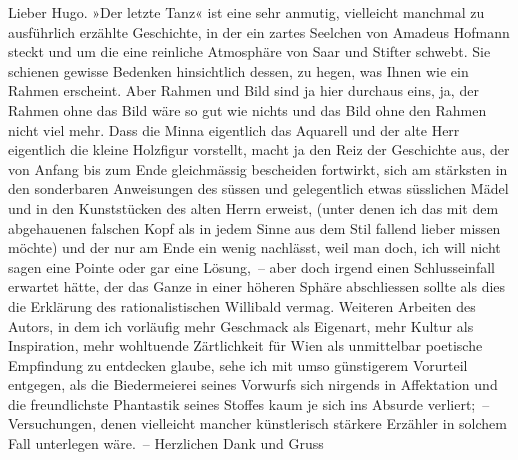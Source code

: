 \pstart\center{}Lieber Hugo.\pend\vspace{0.5em}
\pstart
           »Der letzte Tanz« ist eine sehr anmutig,
               vielleicht manchmal zu ausführlich erzählte Geschichte, in der ein zartes Seelchen
               von Amadeus Hofmann steckt und um die eine
               reinliche Atmosphäre von Saar und Stifter schwebt. Sie schienen gewisse Bedenken
               hinsichtlich dessen, zu hegen, was Ihnen wie ein Rahmen erscheint. Aber Rahmen und
               Bild sind ja hier durchaus eins, ja, der Rahmen ohne das Bild wäre so gut wie nichts
               und das Bild ohne den Rahmen nicht viel mehr. Dass die Minna eigentlich das Aquarell und der alte
               Herr eigentlich die kleine Holzfigur vorstellt, macht ja den Reiz der Geschichte aus,
               der von Anfang bis zum Ende gleichmässig bescheiden fortwirkt, sich am stärksten in
               den sonderbaren Anweisungen des süssen und gelegentlich etwas süsslichen Mädel und in
               den Kunststücken des alten {\pb}Herrn erweist, (unter denen ich
               das mit dem abgehauenen falschen Kopf als in jedem Sinne aus dem Stil fallend lieber
               missen möchte) und der nur am Ende ein wenig nachlässt, weil man doch, ich will nicht
               sagen eine Pointe oder gar eine Lösung, – aber doch irgend einen Schlusseinfall
               erwartet hätte, der das Ganze in einer höheren Sphäre abschliessen sollte als dies
               die Erklärung des rationalistischen Willibald vermag. Weiteren Arbeiten des Autors, in dem ich vorläufig mehr Geschmack als Eigenart,
               mehr Kultur als Inspiration, mehr wohltuende Zärtlichkeit für Wien als unmittelbar poetische Empfindung zu entdecken glaube,
               sehe ich mit umso günstigerem Vorurteil entgegen, als die Biedermeierei seines
               Vorwurfs \introOben{}sich\introOben{} nirgends in Affektation und die freundlichste
               Phantastik seines Stoffes kaum je sich ins Absurde verliert; – Versuchungen, denen
               vielleicht mancher künstlerisch stärkere Erzähler in solchem Fall unterlegen wäre. –
               Herzlichen Dank und Gruss\pend
           
